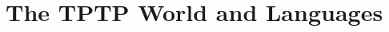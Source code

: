 \documentclass[letterpaper]{article}
\begin{document}

\section{The TPTP World and Languages}
\label{TPTP}
\end{document}
